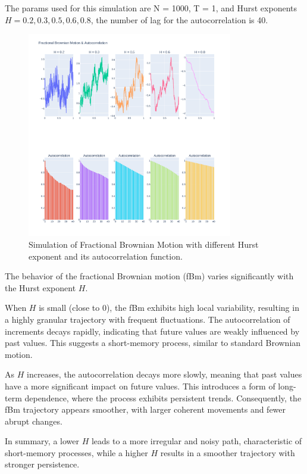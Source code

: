\documentclass[11pt]{extarticle}
\begin{document}
The params used for this simulation are N = 1000, T = 1, and Hurst exponents \( H = 0.2, 0.3, 0.5, 0.6, 0.8 \), the number
of lag for the autocorrelation is 40.

\begin{figure}[!ht]
    \centering
    \includegraphics[width=0.8\textwidth]{img/fdm_autocorr}
    \caption{Simulation of Fractional Brownian Motion with different Hurst exponent and its autocorrelation function.}
    \label{fig:fbm_autocorr}
\end{figure}

\FloatBarrier

The behavior of the fractional Brownian motion (fBm) varies significantly with the Hurst exponent \( H \).

When \( H \) is small (close to 0), the fBm exhibits high local variability, resulting in a highly granular trajectory with frequent fluctuations. The autocorrelation of increments decays rapidly, indicating that future values are weakly influenced by past values. This suggests a short-memory process, similar to standard Brownian motion.

As \( H \) increases, the autocorrelation decays more slowly, meaning that past values have a more significant impact on future values. This introduces a form of long-term dependence, where the process exhibits persistent trends. Consequently, the fBm trajectory appears smoother, with larger coherent movements and fewer abrupt changes.

In summary, a lower \( H \) leads to a more irregular and noisy path, characteristic of short-memory processes, while a higher \( H \) results in a smoother trajectory with stronger persistence.
\end{document}
